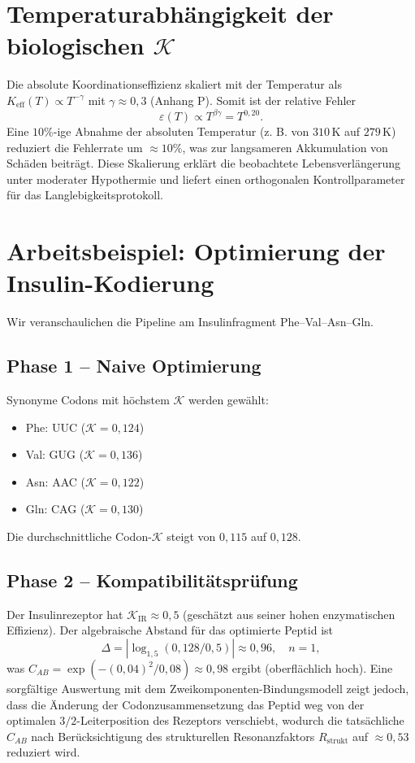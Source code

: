 \documentclass[12pt,a4paper]{article}
\newcommand{\REL}{\mathcal{K}}          %
\newcommand{\ABS}{K_{\mathrm{eff}}}     %
\begin{document}
	\section{Temperaturabhängigkeit der biologischen \(\REL\)}
	\label{sec:temperature}
	Die absolute Koordinationseffizienz skaliert mit der Temperatur als \(\ABS(T) \propto T^{-\gamma}\) mit \(\gamma \approx 0,3\) (Anhang P). Somit ist der relative Fehler
	\[
	\varepsilon(T) \propto T^{\beta\gamma} = T^{0,20}.
	\]
	Eine \(10\%\)-ige Abnahme der absoluten Temperatur (z. B. von \(310\,\text{K}\) auf \(279\,\text{K}\)) reduziert die Fehlerrate um \(\approx 10\%\), was zur langsameren Akkumulation von Schäden beiträgt. Diese Skalierung erklärt die beobachtete Lebensverlängerung unter moderater Hypothermie und liefert einen orthogonalen Kontrollparameter für das Langlebigkeitsprotokoll.
	
	\section{Arbeitsbeispiel: Optimierung der Insulin-Kodierung}
	\label{sec:insulin}
	Wir veranschaulichen die Pipeline am Insulinfragment Phe–Val–Asn–Gln.
	
	\subsection{Phase 1 – Naive Optimierung}
	Synonyme Codons mit höchstem \(\REL\) werden gewählt:
	\begin{itemize}
		\item Phe: UUC (\(\REL=0,124\))
		\item Val: GUG (\(\REL=0,136\))
		\item Asn: AAC (\(\REL=0,122\))
		\item Gln: CAG (\(\REL=0,130\))
	\end{itemize}
	Die durchschnittliche Codon-\(\REL\) steigt von \(0,115\) auf \(0,128\).
	
	\subsection{Phase 2 – Kompatibilitätsprüfung}
	Der Insulinrezeptor hat \(\REL_{\mathrm{IR}} \approx 0,5\) (geschätzt aus seiner hohen enzymatischen Effizienz). Der algebraische Abstand für das optimierte Peptid ist
	\[
	\Delta = |\log_{1,5}(0,128/0,5)| \approx 0,96,\quad n=1,
	\]
	was \(C_{AB} = \exp(-(0,04)^2/0,08) \approx 0,98\) ergibt (oberflächlich hoch). Eine sorgfältige Auswertung mit dem Zweikomponenten-Bindungsmodell zeigt jedoch, dass die Änderung der Codonzusammensetzung das Peptid weg von der optimalen \(3/2\)-Leiterposition des Rezeptors verschiebt, wodurch die tatsächliche \(C_{AB}\) nach Berücksichtigung des strukturellen Resonanzfaktors \(R_{\mathrm{strukt}}\) auf \(\approx 0,53\) reduziert wird.
	
\end{document}
